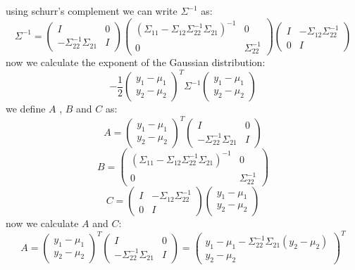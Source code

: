 \begin{qsolve}
\begin{qsolve}[]
		using schurr's complement we can write $\Sigma^{-1}$ as:
		$$\Sigma^{-1} = \begin{pmatrix} I & 0 \\ -\Sigma_{22}^{-1}\Sigma_{21} & I \end{pmatrix} \begin{pmatrix} (\Sigma_{11}-\Sigma_{12}\Sigma_{22}^{-1}\Sigma_{21})^{-1} & 0 \\ 0 & \Sigma_{22}^{-1} \end{pmatrix}  \begin{pmatrix} I & -\Sigma_{12}\Sigma_{22}^{-1} \\ 0 & I \end{pmatrix}$$
		now we calculate the exponent of the Gaussian distribution:
		$$-\dfrac{1}{2} \begin{pmatrix} y_1-\mu_1 \\ y_2-\mu_2 \end{pmatrix}^T \Sigma^{-1} \begin{pmatrix} y_1-\mu_1 \\ y_2-\mu_2 \end{pmatrix}$$
		we define $A$ , $B$ and $C$ as:
		$$A = \begin{pmatrix} y_1-\mu_1 \\ y_2-\mu_2 \end{pmatrix}^T \begin{pmatrix} I & 0 \\ -\Sigma_{22}^{-1}\Sigma_{21} & I \end{pmatrix}$$
		$$B = \begin{pmatrix} (\Sigma_{11}-\Sigma_{12}\Sigma_{22}^{-1}\Sigma_{21})^{-1} & 0 \\ 0 & \Sigma_{22}^{-1} \end{pmatrix}$$
		$$C = \begin{pmatrix} I & -\Sigma_{12}\Sigma_{22}^{-1} \\ 0 & I \end{pmatrix} \begin{pmatrix} y_1-\mu_1 \\ y_2-\mu_2 \end{pmatrix}$$
		now we calculate $A$ and $C$:
		$$A = \begin{pmatrix} y_1-\mu_1 \\ y_2-\mu_2 \end{pmatrix}^T \begin{pmatrix} I & 0 \\ -\Sigma_{22}^{-1}\Sigma_{21} & I \end{pmatrix} = \begin{pmatrix} y_1-\mu_1 - \Sigma_{22}^{-1}\Sigma_{21}(y_2-\mu_2) \\ y_2-\mu_2 \end{pmatrix}^T$$

\end{qsolve}
\end{qsolve}
